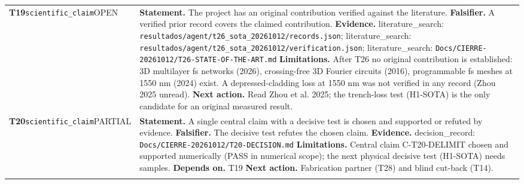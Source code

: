 \begin{longtable}{@{}>{\raggedright\arraybackslash}p{2.35cm}>{\raggedright\arraybackslash}p{13.2cm}@{}}
\textbf{T19}\newline \texttt{scientific\_\allowbreak{}claim}\newline OPEN & \textbf{Statement.} The project has an original contribution verified against the literature. \newline \textbf{Falsifier.} A verified prior record covers the claimed contribution. \newline \textbf{Evidence.} literature\_\allowbreak{}search: \texttt{resultados/\allowbreak{}agent/\allowbreak{}t26\_\allowbreak{}sota\_\allowbreak{}20261012/\allowbreak{}records.json}; literature\_\allowbreak{}search: \texttt{resultados/\allowbreak{}agent/\allowbreak{}t26\_\allowbreak{}sota\_\allowbreak{}20261012/\allowbreak{}verification.json}; literature\_\allowbreak{}search: \texttt{Docs/\allowbreak{}CIERRE-20261012/\allowbreak{}T26-STATE-OF-THE-ART.md} \newline \textbf{Limitations.} After T26 no original contribution is established: 3D multilayer fs networks (2026), crossing-free 3D Fourier circuits (2016), programmable fs meshes at 1550 nm (2024) exist. A depressed-cladding loss at 1550 nm was not verified in any record (Zhou 2025 unread). \newline \textbf{Next action.} Read Zhou et al. 2025; the trench-loss test (H1-SOTA) is the only candidate for an original measured result. \\ \addlinespace[2pt]
\textbf{T20}\newline \texttt{scientific\_\allowbreak{}claim}\newline PARTIAL & \textbf{Statement.} A single central claim with a decisive test is chosen and supported or refuted by evidence. \newline \textbf{Falsifier.} The decisive test refutes the chosen claim. \newline \textbf{Evidence.} decision\_\allowbreak{}record: \texttt{Docs/\allowbreak{}CIERRE-20261012/\allowbreak{}T20-DECISION.md} \newline \textbf{Limitations.} Central claim C-T20-DELIMIT chosen and supported numerically (PASS in numerical scope); the next physical decisive test (H1-SOTA) needs samples. \newline \textbf{Depends on.} T19 \newline \textbf{Next action.} Fabrication partner (T28) and blind cut-back (T14). \\ \addlinespace[2pt]

\end{longtable}
